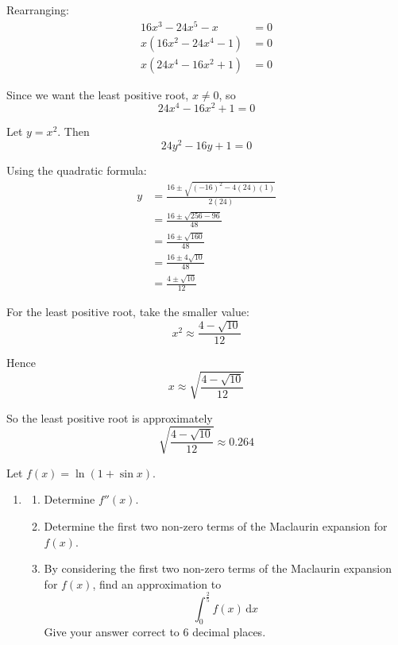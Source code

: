 \documentclass[leqno]{article}
\begin{document}
\begin{enumerate}[
  label=\textbf{\arabic*.},
  leftmargin=*,
  topsep=0pt,
  partopsep=0pt,
  parsep=0pt
]
\begin{djsSolution}
\begin{enumerate}[label=\textbf{(\roman*)}]
Rearranging:
\begin{align*}
16x^3-24x^5-x&=0\\
x(16x^2-24x^4-1)&=0\\
x(24x^4-16x^2+1)&=0
\end{align*}

Since we want the least positive root, \(x\neq 0\), so
\[
24x^4-16x^2+1=0
\]

Let \(y=x^2\). Then
\[
24y^2-16y+1=0
\]

Using the quadratic formula:
\begin{align*}
y&=\frac{16\pm\sqrt{(-16)^2-4(24)(1)}}{2(24)}\\
&=\frac{16\pm\sqrt{256-96}}{48}\\
&=\frac{16\pm\sqrt{160}}{48}\\
&=\frac{16\pm 4\sqrt{10}}{48}\\
&=\frac{4\pm\sqrt{10}}{12}
\end{align*}

For the least positive root, take the smaller value:
\[
x^2\approx \frac{4-\sqrt{10}}{12}
\]

Hence
\[
x\approx \sqrt{\frac{4-\sqrt{10}}{12}}
\]

So the least positive root is approximately
\[
\sqrt{\frac{4-\sqrt{10}}{12}}\approx 0.264
\]
\end{enumerate}
\end{djsSolution}


\newpage

\questionitem

Let $f(x)=\ln(1+\sin x)$. \\
\begin{enumerate}[label=\textbf{(\alph*)}]
  \item
  \begin{enumerate}[label=(\roman*)]
    \item Determine $f''(x)$. 
    \item Determine the first two non-zero terms of the Maclaurin expansion for $f(x)$. 
    \item By considering the first two non-zero terms of the Maclaurin expansion for $f(x)$, find an approximation to
    \[
    \int_0^{\frac{2}{5}} f(x)\,\mathrm{d}x
    \]
    Give your answer correct to $6$ decimal places.  \\
  \end{enumerate}
\end{enumerate}


\end{enumerate}
\end{document}
